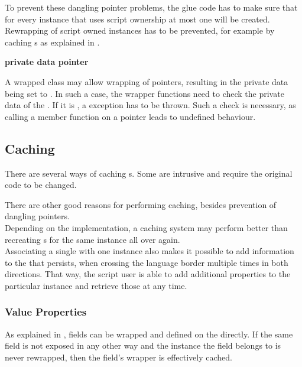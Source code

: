 To prevent these dangling pointer problems, the glue code has to make sure that for every  instance that uses script ownership at most one  will be created. Rewrapping of script owned instances has to be prevented, for example by caching s as explained in .

\textbf{ private data  pointer}

A wrapped class may allow wrapping of  pointers, resulting in the private data being set to . In such a case, the wrapper functions need to check the private data of the  . If it is , a  exception has to be thrown. Such a check is necessary, as calling a member function on a  pointer leads to undefined behaviour.

\subsection{Caching}
\label{sec:Caching}

There are several ways of caching s. Some are intrusive and require the original  code to be changed.

There are other good reasons for performing caching, besides prevention of dangling pointers.\\
Depending on the implementation, a caching system may perform better than recreating s for the same  instance all over again.\\
Associating a single  with one  instance  also makes it possible to add information to the  that persists, when crossing the language border  multiple times in both directions. That way, the script user is able to add additional properties to the particular instance and retrieve those at any time.

\subsubsection{Value Properties}

As explained in , fields can be wrapped and defined on the  directly. If the same field is not exposed in any other way and the instance the field belongs to is never rewrapped, then the field's wrapper  is effectively cached.

